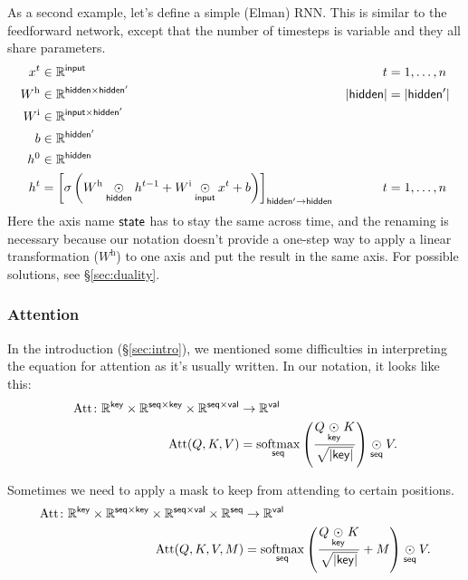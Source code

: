 \documentclass{article}
\begin{document}
As a second example, let's define a simple (Elman) RNN. This is similar to the feedforward network, except that the number of timesteps is variable and they all share parameters.
\begin{align*}
x^{t} &\in \mathbb{R}^{\name{input}} & t &= 1, \ldots, n \\
W^{\text{h}} &\in \mathbb{R}^{\name{hidden} \times \name{hidden'}} & |\name{hidden}| &= |\name{hidden'}| \\
W^{\text{i}} &\in \mathbb{R}^{\name{input} \times \name{hidden'}} \\
b &\in \mathbb{R}^{\name{hidden'}} \\
h^{0} &\in \mathbb{R}^{\name{hidden}} \\
h^{t} &= \nmov{hidden'}{hidden}{\sigma\left( W^{\text{h}} \ndot{hidden} h^{t-1} + W^{\text{i}} \ndot{input} x^{t} + b \right)} & t &= 1, \ldots, n
\end{align*}
Here the axis name $\name{state}$ has to stay the same across time, and the renaming is necessary because our notation doesn't provide a one-step way to apply a linear transformation ($W^{\text{h}}$) to one axis and put the result in the same axis. For possible solutions, see \S\ref{sec:duality}.

\subsubsection{Attention}
\label{sec:attention}

In the introduction (\S\ref{sec:intro}), we mentioned some difficulties in interpreting the equation for attention as it's usually written. In our notation, it looks like this:
\begin{align*}
  \text{Att} \colon \mathbb{R}^{\name{key}} \times \mathbb{R}^{\name{seq} \times\name{key}} \times \mathbb{R}^{\name{seq} \times\name{val}} &\rightarrow \mathbb{R}^{\name{val}} \\
  \text{Att}(Q,K,V) &= \nfun{seq}{softmax} \left( \frac{Q \ndot{key} K}{\sqrt{|\name{key}|}} \right) \ndot{seq} V.
\end{align*}

Sometimes we need to apply a mask to keep from attending to certain positions.
\begin{align*}
  \text{Att} \colon \mathbb{R}^{\name{key}} \times \mathbb{R}^{\name{seq} \times\name{key}} \times \mathbb{R}^{\name{seq} \times\name{val}} \times \mathbb{R}^{\name{seq}} &\rightarrow \mathbb{R}^{\name{val}} \\
\text{Att}(Q, K, V, M) &= \nfun{seq}{softmax} \left( \frac{Q \ndot{key} K}{\sqrt{|\name{key}|}} + M \right) \ndot{seq} V.
\end{align*}
\end{document}
